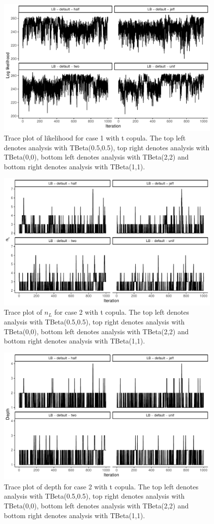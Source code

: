 \documentclass{amsart}
\begin{document}
\begin{figure}
	\centering
	\includegraphics[width = 0.75\linewidth]{trace_case1_t_like.pdf}
	\caption{Trace plot of likelihood for case 1 with t copula. The top left denotes analysis with TBeta(0.5,0.5), top right denotes analysis with TBeta(0,0), bottom left denotes analysis with TBeta(2,2) and bottom right denotes analysis with TBeta(1,1).}
	\label{fig:case1:t:like}
\end{figure}

\begin{figure}
	\centering
	\includegraphics[width = 0.75\linewidth]{trace_case2_t_nterm.pdf}
	\caption{Trace plot of $n_L$ for case 2 with t copula. The top left denotes analysis with TBeta(0.5,0.5), top right denotes analysis with TBeta(0,0), bottom left denotes analysis with TBeta(2,2) and bottom right denotes analysis with TBeta(1,1).}
	\label{fig:case2:t:nterm}
\end{figure}

\begin{figure}
	\centering
	\includegraphics[width = 0.75\linewidth]{trace_case2_t_depth.pdf}
	\caption{Trace plot of depth for case 2 with t copula. The top left denotes analysis with TBeta(0.5,0.5), top right denotes analysis with TBeta(0,0), bottom left denotes analysis with TBeta(2,2) and bottom right denotes analysis with TBeta(1,1).}
	\label{fig:case2:t:depth}
\end{figure}
\end{document}
